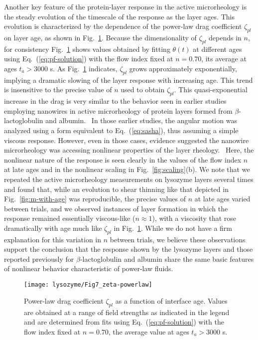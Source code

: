 Another key feature of the protein-layer response in the active microrheology is the steady evolution of the timescale of the response as the layer ages.  This evolution is characterized by the dependence of the power-law drag coefficient $\zeta_{pl}$ on layer age, as shown in Fig.~\ref{fig:zeta-powerlaw}.  Because the dimensionality of $\zeta_{pl}$ depends in $n$, for consistency Fig.~\ref{fig:zeta-powerlaw} shows values obtained by fitting $\theta(t)$ at different ages using Eq.~(\ref{eq:pf-solution}) with the flow index fixed at $n=0.70$, its average at ages $t_a > 3000$ s.  As Fig.~\ref{fig:zeta-powerlaw} indicates, $\zeta_{pl}$ grows approximately exponentially, implying a dramatic slowing of the layer response with increasing age. This trend is insensitive to the precise value of $n$ used to obtain $\zeta_{pl}$.  This quasi-exponential increase in the drag is very similar to the behavior seen in earlier studies employing nanowires in active microrheology of protein layers formed from $\beta$-lactoglobulin and albumin.~\cite{Lee2010, Dhar2010}  In those earlier studies, the angular motion was analyzed using a form equivalent to Eq.~(\ref{eq:sasha}), thus assuming a simple viscous response.  However, even in those cases, evidence suggested the nanowire microrheology was accessing nonlinear properties of the layer rheology.~\cite{Lee2010}  Here, the nonlinear nature of the response is seen clearly in the values of the flow index $n$ at late ages and in the nonlinear scaling in Fig.~\ref{fig:scaling}(b).  We note that we repeated the active microrheology measurements on lysozyme layers several times and found that, while an evolution to shear thinning like that depicted in Fig.~\ref{fig:m-with-age} was reproducible, the precise values of $n$ at late ages varied between trials, and we observed instances of layer formation in which the response remained essentially viscous-like ($n \approx 1$), with a viscosity that rose dramatically with age much like $\zeta_{pl}$ in Fig.~\ref{fig:zeta-powerlaw}. While we do not have a firm explanation for this variation in $n$ between trials, we believe these observations support the conclusion that the response shown by the lysozyme layers and those reported previously for $\beta$-lactoglobulin and albumin share the same basic features of nonlinear behavior characteristic of power-law fluids.  


\begin{figure}
  \texttt{[image: lysozyme/Fig7\_zeta-powerlaw]}
  \caption{\label{fig:zeta-powerlaw}Power-law drag coefficient $\zeta_{pl}$ as a function of interface age. Values are obtained at a range of field strengths as indicated in the legend and are determined from fits using Eq.~(\ref{eq:pf-solution}) with the flow index fixed at $n = 0.70$, the average value at ages $t_a > 3000$ s.}
\end{figure}

